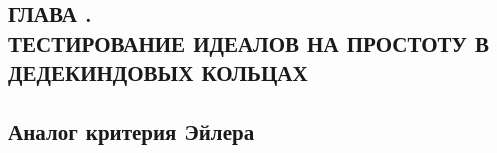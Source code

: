 \documentclass[_dissertation.tex]{subfiles}
\begin{document}
\onlyinsubfile{
    \renewcommand{\contentsname}{ОГЛАВЛЕНИЕ}
    \setcounter{tocdepth}{3}
    \tableofcontents
}

\newpage
\begin{center}
    \section*{ГЛАВА .\\ ТЕСТИРОВАНИЕ ИДЕАЛОВ НА ПРОСТОТУ В ДЕДЕКИНДОВЫХ КОЛЬЦАХ}\label{ch:Primality}
\end{center}

\subsection{Аналог критерия Эйлера}
\end{document}
